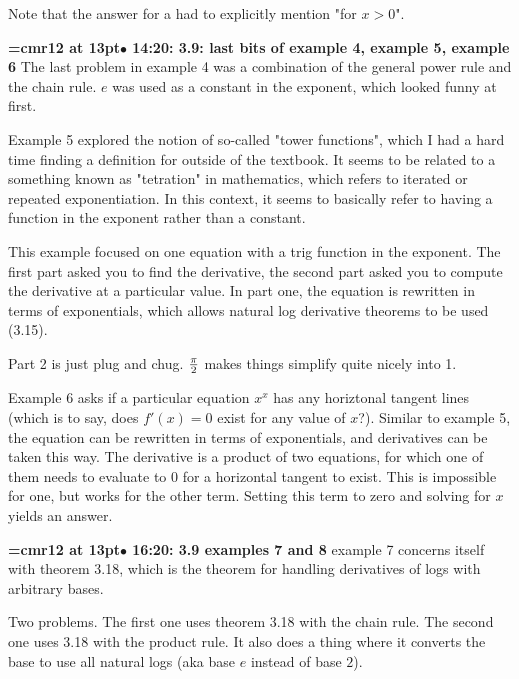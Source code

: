 Note that the answer for a had to explicitly mention "for $x > 0$".
\par

{\smallskip\noindent\bf\font\titlefont=cmr12 at 13pt\titlefont $\bullet$ 14:20: 3.9: last bits of example 4, example 5, example 6}\smallskip
The last problem in example 4 was a combination of the general power rule and the chain rule. $e$ was used as a constant in the exponent, which looked funny at first.
\par

Example 5 explored the notion of so-called "tower functions", which I had a hard time finding a definition for outside of the textbook. It seems to be related to a something known as "tetration" in mathematics, which refers to iterated or repeated exponentiation. In this context, it seems to basically refer to having a function in the exponent rather than a constant.
\par

This example focused on one equation with a trig function in the exponent. The first part asked you to find the derivative, the second part asked you to compute the derivative at a particular value. In part one, the equation is rewritten in terms of exponentials, which allows natural log derivative theorems to be used (3.15).
\par

Part 2 is just plug and chug. $\pi \over 2$ makes things simplify quite nicely into 1.
\par

Example 6 asks if a particular equation $x^x$ has any horiztonal tangent lines (which is to say, does $f'(x) = 0$ exist for any value of $x$?). Similar to example 5, the equation can be rewritten in terms of exponentials, and derivatives can be taken this way. The derivative is a product of two equations, for which one of them needs to evaluate to 0 for a horizontal tangent to exist. This is impossible for one, but works for the other term. Setting this term to zero and solving for $x$ yields an answer.
\par

{\smallskip\noindent\bf\font\titlefont=cmr12 at 13pt\titlefont $\bullet$ 16:20: 3.9 examples 7 and 8}\smallskip
example 7 concerns itself with theorem 3.18, which is the theorem for handling derivatives of logs with arbitrary bases.
\par

Two problems. The first one uses theorem 3.18 with the chain rule. The second one uses 3.18 with the product rule. It also does a thing where it converts the base to use all natural logs (aka base $e$ instead of base $2$).
\par

